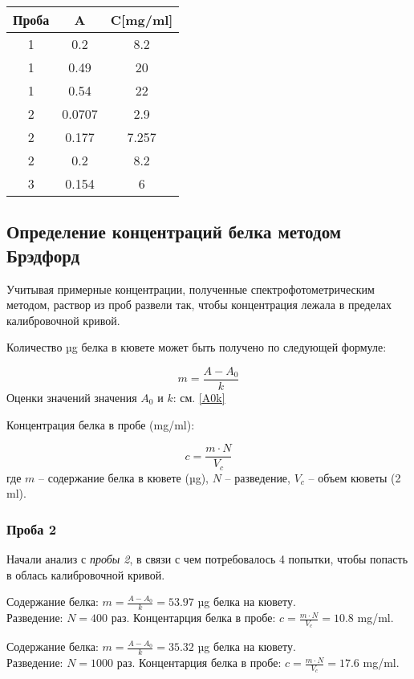 \begin{tabular}{|c|c|c|}
\hline
Проба & A & C[mg/ml] \\
\hline
1 & 0.2 & 8.2 \\
1 & 0.49 & 20 \\
1 & 0.54 & 22 \\
\hline
2 & 0.0707 & 2.9 \\
2 & 0.177 & 7.257 \\
2 & 0.2 & 8.2 \\
\hline
3 & 0.154 & 6 \\
\hline
\end{tabular}

\subsection{Определение концентраций белка методом Брэдфорд}

Учитывая примерные концентрации, полученные спектрофотометрическим методом,
раствор из проб развели так, чтобы концентрация лежала в пределах
калибровочной кривой.

Количество µg белка в кювете может быть получено по следующей формуле:

$$ m = \frac{A-A_0}{k} $$
Оценки значений значения $A_0$ и $k$: см. \ref {A0k}

Концентрация белка в пробе (mg/ml):

$$ c = \frac{m \cdot N}{V_c} $$
где $m$ -- содержание белка в кювете (µg),
$N$ -- разведение,
$V_c$ -- объем кюветы (2 ml).

\subsubsection{Проба 2}
Начали анализ с \emph{пробы 2}, в связи с чем потребовалось 4 попытки,
чтобы попасть в облась калибровочной кривой.

\def\svgwidth{\linewidth}

\def\svgwidth{\linewidth}
Содержание белка: $ m = \frac{A-A_0}{k} = 53.97 $ µg белка на кювету. \\
Разведение: $ N = 400 $ раз.
Концентарция белка в пробе: $ c = \frac{m \cdot N}{V_c} = 10.8 $ mg/ml.

\def\svgwidth{\linewidth}
Содержание белка: $ m = \frac{A-A_0}{k} = 35.32 $ µg белка на кювету. \\
Разведение: $ N = 1000 $ раз.
Концентарция белка в пробе: $ c = \frac{m \cdot N}{V_c} = 17.6 $ mg/ml.

